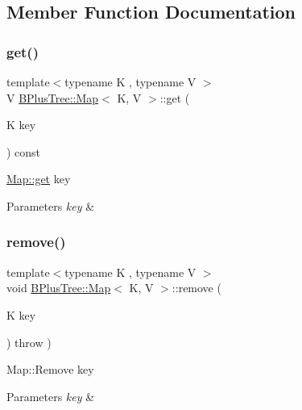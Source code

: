 \subsection{Member Function Documentation}
\mbox{\label{class_b_plus_tree_1_1_map_a28d991d412dd816530c8509274d48a0a}} 
\subsubsection{\texorpdfstring{get()}{get()}}
{\footnotesize\ttfamily template$<$typename K , typename V $>$ \\
V \hyperlink{class_b_plus_tree_1_1_map}{B\+Plus\+Tree\+::\+Map}$<$ K, V $>$\+::get (\begin{DoxyParamCaption}\item[{K}]{key }\end{DoxyParamCaption}) const}

\hyperlink{class_b_plus_tree_1_1_map_a28d991d412dd816530c8509274d48a0a}{Map\+::get} key


\begin{DoxyParams}{Parameters}
{\em key} & \\
\hline
\end{DoxyParams}
\mbox{\label{class_b_plus_tree_1_1_map_a99b2e74d5c38e0e27fe8031e1f9990f8}} 
\subsubsection{\texorpdfstring{remove()}{remove()}}
{\footnotesize\ttfamily template$<$typename K , typename V $>$ \\
void \hyperlink{class_b_plus_tree_1_1_map}{B\+Plus\+Tree\+::\+Map}$<$ K, V $>$\+::remove (\begin{DoxyParamCaption}\item[{K}]{key }\end{DoxyParamCaption}) throw  ) }

Map\+::\+Remove key


\begin{DoxyParams}{Parameters}
{\em key} & \\
\hline
\end{DoxyParams}

